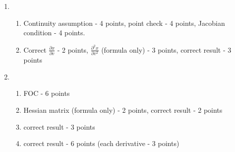 \begin{enumerate}
  \item 
      \begin{enumerate} 
          \item
Continuity assumption - 4 points,
point check - 4 points,
Jacobian condition - 4 points.
          \item
Correct $\frac{\partial x}{\partial v}$  - 2 points,
$\frac{\partial ^2 x}{\partial v^2}$ (formula only) - 3 points,
correct result - 3 points
      \end{enumerate}
  \item 
      \begin{enumerate} 
              \item
FOC - 6 points
\item
Hessian matrix (formula only) - 2 points, correct result - 2 points
\item
correct result - 3 points
\item
correct result - 6 points (each derivative - 3 points)
      \end{enumerate}


\end{enumerate}





